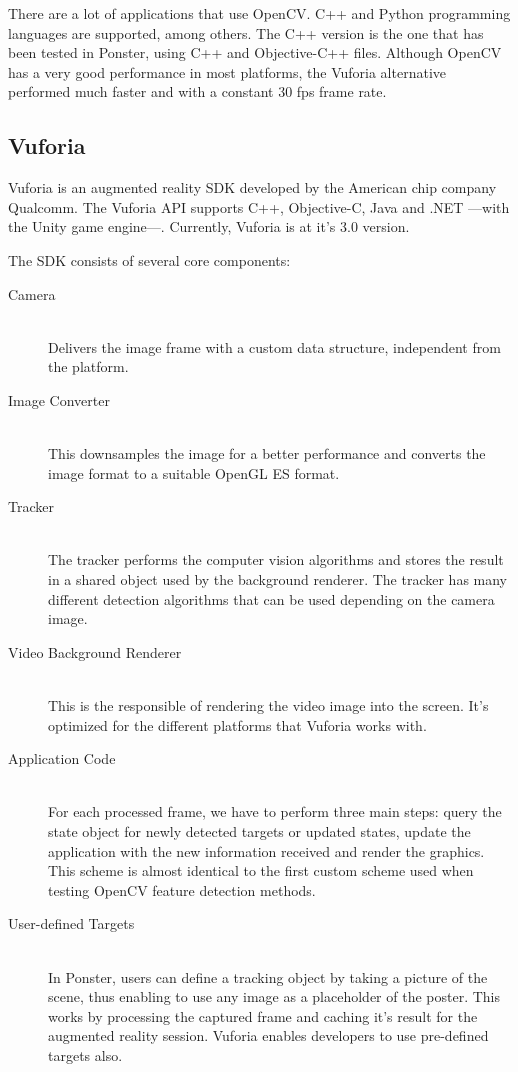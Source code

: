 There are a lot of applications that use OpenCV. C++ and Python programming
languages are supported, among others. The C++ version is the one that has been
tested in Ponster, using C++ and Objective-C++ files. Although OpenCV has a
very good performance in most platforms, the Vuforia alternative performed much
faster and with a constant 30 fps frame rate.

\subsection{Vuforia}
\label{sec:vuforia}
Vuforia is an augmented reality SDK developed by the American chip company
Qualcomm\textregistered. The Vuforia API supports C++, Objective-C, Java and .NET
---with the Unity game engine---. Currently, Vuforia is at it's 3.0 version. 

The SDK consists of several core components\cite{vuforiasdk01}: 
\begin{description}
\item [Camera] \hfill \\
Delivers the image frame with a custom data structure, independent from the
platform.
\item [Image Converter] \hfill \\
This downsamples the image for a better performance and converts the image format to
a suitable OpenGL ES format.
\item [Tracker] \hfill \\
The tracker performs the computer vision algorithms and stores the result in a
shared object used by the background renderer. The tracker has many different
detection algorithms that can be used depending on the camera image.
\item [Video Background Renderer] \hfill \\
This is the responsible of rendering the video image into the screen. It's optimized
for the different platforms that Vuforia works with.
\item [Application Code] \hfill \\
For each processed frame, we have to perform three main steps: query the state
object for newly detected targets or updated states, update the application with the
new information received and render the graphics. This scheme is almost identical to
the first custom scheme used when testing OpenCV feature detection methods.
\item [User-defined Targets] \hfill \\
In Ponster, users can define a tracking object by taking a picture of the scene,
thus enabling to use any image as a placeholder of the poster. This works by
processing the captured frame and caching it's result for the augmented reality
session. Vuforia enables developers to use pre-defined targets also.
\end{description}


